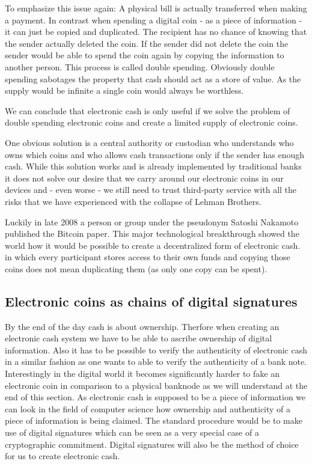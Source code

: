 \documentclass[ebook,12pt,oneside,openany]{memoir}
\begin{document}
To emphasize this issue again: A physical bill is actually transferred when making a payment. In contrast when spending a digital coin - as a piece of information - it can just be copied and duplicated.
The recipient has no chance of knowing that the sender actually deleted the coin.
If the sender did not delete the coin the sender would be able to spend the coin again by copying the information to another person.
This process is called double spending.
Obviously double spending sabotages the property that cash should act as a store of value. As the supply would be infinite a single coin would always be worthless. 

We can conclude that electronic cash is only useful if we solve the problem of double spending electronic coins and create a limited supply of electronic coins.

One obvious solution is a central authority or custodian who understands who owns which coins and who allows cash transactions only if the sender has enough cash.
While this solution works and is already implemented by traditional banks it does not solve our desire that we carry around our electronic coins in our devices and - even worse - we still need to trust third-party service with all the risks that we have experienced with the collapse of Lehman Brothers.

Luckily in late 2008 a person or group under the pseudonym Satoshi Nakamoto published the Bitcoin paper.
This major technological breakthrough showed the world how it would be possible to create a decentralized form of electronic cash.
in which every participant stores access to their own funds and copying those coins does not mean duplicating them (as only one copy can be spent).

\subsection{Electronic coins as chains of digital signatures}
By the end of the day cash is about ownership.
Therfore when creating an electronic cash system we have to be able to ascribe ownership of digital information.
Also it has to be possible to verify the authenticity of electronic cash in a similar fashion as one wants to able to verify the authenticity of a bank note.
Interestingly in the digital world it becomes significantly harder to fake an electronic coin in comparison to a physical banknode as we will understand at the end of this section.
As electronic cash is supposed to be a piece of information we can look in the field of computer science how ownership and authenticity of a piece of information is being claimed.
The standard procedure would be to make use of \gls{digital signature}s which can be seen as a very special case of a \gls{cryptographic commitment}.
Digital signatures will also be the method of choice for us to create electronic cash.
\end{document}
